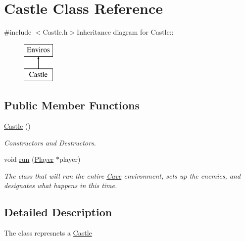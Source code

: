 \hypertarget{classCastle}{
\section{Castle Class Reference}
\label{classCastle}
}


{\ttfamily \#include $<$Castle.h$>$}Inheritance diagram for Castle::\begin{figure}[H]
\begin{center}
\leavevmode
\includegraphics[height=2cm]{classCastle}
\end{center}
\end{figure}
\subsection*{Public Member Functions}
\begin{DoxyCompactItemize}
\item 
\hypertarget{classCastle_ab5a57307b5e4c8ecb6f8f0524684e6d6}{
\hyperlink{classCastle_ab5a57307b5e4c8ecb6f8f0524684e6d6}{Castle} ()}
\label{classCastle_ab5a57307b5e4c8ecb6f8f0524684e6d6}

\begin{DoxyCompactList}\small\item\em Constructors and Destructors. \item\end{DoxyCompactList}\item 
void \hyperlink{classCastle_a4a961593bd68b77a7839d31da9d8dcd6}{run} (\hyperlink{classPlayer}{Player} $\ast$player)
\begin{DoxyCompactList}\small\item\em The class that will run the entire \hyperlink{classCave}{Cave} environment, sets up the enemies, and designates what happens in this time. \item\end{DoxyCompactList}\end{DoxyCompactItemize}


\subsection{Detailed Description}
The class represnets a \hyperlink{classCastle}{Castle} 

